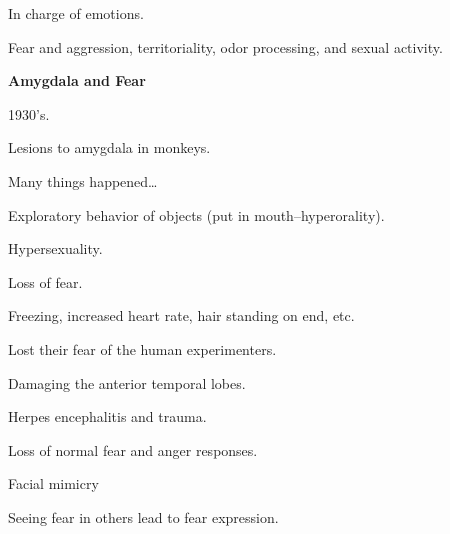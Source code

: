 \begin{coloredlist}
\begin{coloredlist}
\begin{coloredlist}
        \end{coloredlist}
        \item {}
        \begin{coloredlist}
            \item In charge of emotions.
            \item Fear and aggression, territoriality, odor processing, and sexual activity.
            \item \textbf{Amygdala and Fear}
            \begin{coloredlist}
                \item 1930's.
                \item Lesions to amygdala in monkeys.
                \item Many things happened\ldots
                \begin{coloredlist}
                    \item Exploratory behavior of objects (put in mouth--hyperorality).
                    \item Hypersexuality.
                    \item Loss of fear.
                    \begin{coloredlist}
                        \item Freezing, increased heart rate, hair standing on end, etc.
                        \item Lost their fear of the human experimenters.
                    \end{coloredlist}
                \end{coloredlist}
                \item {}
                \begin{coloredlist}
                    \item Damaging the anterior temporal lobes.
                    \item Herpes encephalitis and trauma.
                \end{coloredlist}
                \begin{coloredlist}
                    \item Loss of normal fear and anger responses.
                \end{coloredlist}
                \item Facial mimicry
                \begin{coloredlist}
                    \item Seeing fear in others lead to fear expression.

\end{coloredlist}
\end{coloredlist}
\end{coloredlist}
\end{coloredlist}
\end{coloredlist}
